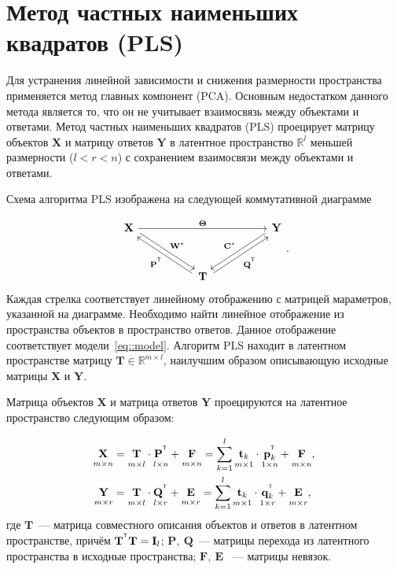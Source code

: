 \documentclass[12pt,twoside]{article}
\newcommand{\bY}{\mathbf{Y}}
\newcommand{\bX}{\mathbf{X}}
\newcommand{\bt}{\mathbf{t}}
\newcommand{\bp}{\mathbf{p}}
\newcommand{\bq}{\mathbf{q}}
\newcommand{\bP}{\mathbf{P}}
\newcommand{\bT}{\mathbf{T}}
\newcommand{\bQ}{\mathbf{Q}}
\newcommand{\bC}{\mathbf{C}}
\newcommand{\bE}{\mathbf{E}}
\newcommand{\bF}{\mathbf{F}}
\newcommand{\bW}{\mathbf{W}}
\newcommand{\bI}{\mathbf{I}}
\newcommand{\bTheta}{\boldsymbol{\Theta}}
\begin{document}
\section{Метод частных наименьших квадратов (PLS)}

Для устранения линейной зависимости и снижения размерности пространства применяется метод главных компонент (PCA). 
Основным недостатком данного метода является то, что он не учитывает взаимосвязь между объектами и ответами.
Метод частных наименьших квадратов (PLS) проецирует матрицу объектов $\bX$ и матрицу ответов $\bY$ в латентное пространство $\mathbb{R}^l$ меньшей размерности ($l < r < n$) с сохранением взаимосвязи между объектами и ответами.

Схема алгоритма PLS изображена на следующей коммутативной диаграмме

\[
\begin{tikzcd}[column sep=5em, row sep=3em]
\bX
\arrow[]{rr}{\bTheta}
\arrow[shift left=0.5ex]{dr}{\bW^*}
& & \bY
\arrow[swap, shift right=0.5ex]{dl}{\bC^*}
\\
& \bT
\arrow[shift left=0.5ex]{ul}{\bP^{\T}}
\arrow[swap, shift right=0.5ex]{ur}{\bQ^{\T}}
\end{tikzcd}.
\]
Каждая стрелка соответствует линейному отображению с матрицей мараметров, указанной на диаграмме.
Необходимо найти линейное отображение из пространства объектов в пространство ответов. 
Данное отображение соответствует модели~\eqref{eq::model}. 
Алгоритм PLS находит в латентном пространстве матрицу $\bT \in \mathbb{R}^{m \times l}$, наилучшим образом описывающую исходные матрицы $\bX$ и $\bY$.

Матрица объектов $\bX$ и матрица ответов $\bY$ проецируются на латентное пространство следующим образом:

\begin{align}
\label{eq::PLS_X}
 \underset{m \times n}{\vphantom{\bQ}\bX} 
 &= \underset{m \times l}{\vphantom{\bQ}\bT} \cdot \underset{l \times n}{\vphantom{\bQ}\bP^{\T}} + \underset{m \times n}{\vphantom{\bQ}\bF} 
 = \sum_{k=1}^l \underset{m \times 1}{\vphantom{\bp_k^{\T}}\bt_k} \cdot \underset{1 \times n}{\bp_k^{\T}} + \underset{m \times n}{\vphantom{\bp_k^{\T}}\bF},\\
 \label{eq::PLS_Y}
 \underset{m \times r}{\vphantom{\bQ}\bY} 
 &= \underset{m \times l}{\vphantom{\bQ}\bT} \cdot \underset{l \times r}{\bQ^{\T}} + \underset{m \times r}{\vphantom{\bQ}\bE}
 =  \sum_{k=1}^l  \underset{m \times 1}{\vphantom{\bq_k^{\T}}\bt_k} \cdot \underset{1 \times r}{\bq_k^{\T}} +  \underset{m \times r}{\vphantom{\bq_k^{\T}}\bE},
\end{align}
где $\bT$~--- матрица совместного описания объектов и ответов в латентном пространстве, причём $\bT^{\T} \bT = \bI_{l}$; $\bP,\ \bQ$~--- матрицы перехода из латентного пространства в  исходные пространства; $\bF,\ \bE$
~--- матрицы невязок. 
\end{document}
